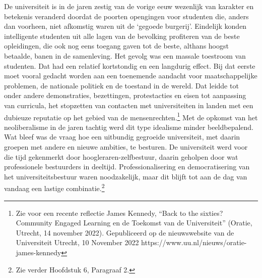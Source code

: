 \documentclass[empirical, authordate, ]{new-jote-article}
\begin{document}
	De universiteit is in de jaren zestig van de vorige eeuw wezenlijk van karakter en betekenis veranderd doordat de poorten opengingen voor studenten die, anders dan voorheen, niet afkomstig waren uit de ‘gegoede burgerij'. Eindelijk konden intelligente studenten uit alle lagen van de bevolking profiteren van de beste opleidingen, die ook nog eens toegang gaven tot de beste, althans hoogst betaalde, banen in de samenleving. Het gevolg was een massale toestroom van studenten. Dat had een relatief kortstondig en een langdurig effect. Bij dat eerste moet vooral gedacht worden aan een toenemende aandacht voor maatschappelijke problemen, de nationale politiek en de toestand in de wereld. Dat leidde tot onder andere demonstraties, bezettingen, protestacties en eisen tot aanpassing van curricula, het stopzetten van contacten met universiteiten in landen met een dubieuze reputatie op het gebied van de mensenrechten.\footnote{Zie voor een recente reflectie James Kennedy, “Back to the sixties? Community Engaged Learning en de Toekomst van de Universiteit” (Oratie, Utrecht, 14 november 2022). Gepubliceerd op de nieuwswebsite van de Universiteit Utrecht, 10 November 2022 https://www.uu.nl/nieuws/oratie-james-kennedy } Met de opkomst van het neoliberalisme in de jaren tachtig werd dit type idealisme minder beeldbepalend. Wat bleef was de vraag hoe een uitbundig gegroeide universiteit, met daarin groepen met andere en nieuwe ambities, te besturen. De universiteit werd voor die tijd gekenmerkt door hoogleraren-zelfbestuur, daarin geholpen door wat professionele bestuurders in deeltijd. Professionalisering en democratisering van het universiteitsbestuur waren noodzakelijk, maar dit blijft tot aan de dag van vandaag een lastige combinatie.\footnote{Zie verder Hoofdstuk 6, Paragraaf 2.}
\end{document}
